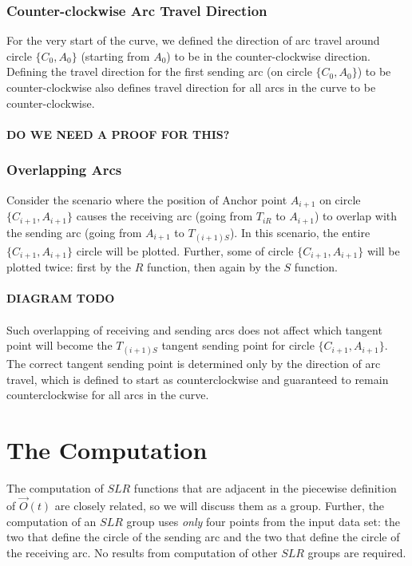 \documentclass{article}
\begin{document}
\subsubsection{Counter-clockwise Arc Travel Direction}
For the very start of the curve, we defined the direction of arc travel around circle $\{C_0, A_0\}$ (starting from $A_0$) to be in the counter-clockwise direction.
Defining the travel direction for the first sending arc (on circle $\{C_0, A_0\}$) to be counter-clockwise also defines travel direction for all arcs in the curve to be counter-clockwise.\\ \\

\textbf{DO WE NEED A PROOF FOR THIS?} \\

\subsubsection{Overlapping Arcs}
Consider the scenario where the position of Anchor point $A_{i+1}$ on circle $\{C_{i+1}, A_{i+1}\}$ causes the receiving arc (going from $T_{iR}$ to $A_{i+1}$) to overlap with the sending arc (going from $A_{i+1}$ to $T_{(i+1)S}$). In this scenario, the entire $\{C_{i+1}, A_{i+1}\}$ circle will be plotted. Further, some of circle $\{C_{i+1}, A_{i+1}\}$ will be plotted twice: first by the $R$ function, then again by the $S$ function.\\ \\
\textbf{DIAGRAM TODO}\\ \\
Such overlapping of receiving and sending arcs does not affect which tangent point will become the $T_{(i+1)S}$ tangent sending point for circle $\{C_{i+1}, A_{i+1}\}$. The correct tangent sending point is determined only by the direction of arc travel, which is defined to start as counterclockwise and guaranteed to remain counterclockwise for all arcs in the curve.

\section{The Computation}
The computation of $SLR$ functions that are adjacent in the piecewise definition of $\overrightarrow{O}(t)$ are closely related, so we will discuss them as a group. Further, the computation of an $SLR$ group uses \textit{only} four points from the input data set: the two that define the circle of the sending arc and the two that define the circle of the receiving arc. No results from computation of other $SLR$ groups are required.
\end{document}
